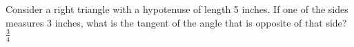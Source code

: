 {Consider a right triangle with a hypotenuse of length 5 inches. If one of the sides measures 3 inches, what is the tangent of the angle that is opposite of that side?}
{$\frac{3}{4}$}
